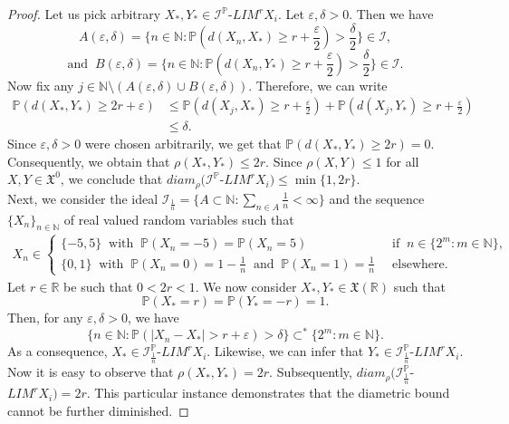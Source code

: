 \documentclass[reqno]{amsart}
\begin{document}
\begin{proof}
Let us pick  arbitrary $X_*,Y_*\in$$\mathcal{I}^{\mathbb{P}}$-$LIM^rX_i$. Let $\varepsilon,\delta>0$. Then we have 
$$
A(\varepsilon,\delta)=\{n\in\mathbb{N}:\mathbb{P}(d(X_n,X_*)\geq r+\frac{\varepsilon}{2})>\frac{\delta}{2}\}\in \mathcal{I},$$
$$\mbox{and }~B(\varepsilon,\delta)=\{n\in\mathbb{N}:\mathbb{P}(d(X_n,Y_*)\geq r+\frac{\varepsilon}{2})>\frac{\delta}{2}\}\in \mathcal{I}.
$$
Now fix any $j\in\mathbb{N}\setminus (A(\varepsilon,\delta)\cup B(\varepsilon,\delta))$. Therefore, we can write
\begin{align*}
	\mathbb{P}(d(X_*,Y_*)\geq 2r+\varepsilon)&\leq \mathbb{P}(d(X_j,X_*)\geq {r}+\frac{\varepsilon}{2})+\mathbb{P}(d(X_j,Y_*)\geq {r}+\frac{\varepsilon}{2})\\
	&\leq\delta.
\end{align*}
Since $\varepsilon,\delta>0$ were chosen arbitrarily, we get that $\mathbb{P}(d(X_*,Y_*)\geq 2r)=0$. Consequently, we obtain that $\rho(X_*,Y_*)\leq 2r$. Since  $\rho(X,Y)\leq 1$ for all $X,Y\in \mathfrak{X^0}$, we conclude that $diam_{\rho}(\mathcal{I}^{\mathbb{P}}$-$LIM^rX_i)\leq \min\{1,2r\}$.\\

Next, we consider the ideal $\mathcal{I}_{\frac{1}{n}}=\{A\subset\mathbb{N}:\sum_{n\in A}\frac{1}{n}<\infty\}$ and the sequence $\{X_n\}_{n\in\mathbb{N}}$ of real valued random variables such that 
	\begin{align*}
	X_{n}\in
	\begin{cases}
		\{-5,5\}~\mbox{ with }~ \mathbb{P}(X_n=-5)=\mathbb{P}(X_n=5)~&\mbox{ if }~n\in \{2^m: m\in\mathbb{N}\}, \\
	\{0,1\}~\mbox{ with }~ \mathbb{P}(X_n=0)=1-\frac{1}{n}~\mbox{ and }~ \mathbb{P}(X_n=1)=\frac{1}{n}~&\mbox{ elsewhere}.
	\end{cases}
\end{align*}
Let $r\in\mathbb{R}$ be such that  $0<2r<1$. We now consider $X_*,Y_*\in\mathfrak{X}(\mathbb{R})$  such that $$\mathbb{P}(X_*=r)=\mathbb{P}(Y_*=-r)=1.$$
 Then, for any $\varepsilon,\delta>0$, we have
 $$\{n\in\mathbb{N}:\mathbb{P}(|X_n-X_*|>r+\varepsilon)>\delta\}\subset^*\{2^m:m\in\mathbb{N}\}.$$
As a consequence, $X_*\in $$\mathcal{I}_{\frac{1}{n}}^{\mathbb{P}}$-$LIM^rX_i$. Likewise, we can infer that $Y_*\in $$\mathcal{I}_{\frac{1}{n}}^{\mathbb{P}}$-$LIM^rX_i$. Now it is easy to observe that $\rho(X_*,Y_*)=2r$. Subsequently, $diam_{\rho}(\mathcal{I}_{\frac{1}{n}}^{\mathbb{P}}$-$LIM^rX_i)=2r$. This particular instance demonstrates that the diametric bound cannot be further diminished.
\end{proof}
\end{document}
